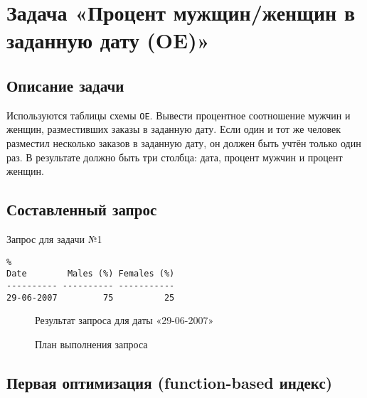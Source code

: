 \chapter{Задача «Процент мужщин/женщин в заданную дату (OE)»}


\section{Описание задачи}


Используются таблицы схемы \texttt{OE}. Вывести процентное соотношение мужчин и женщин, разместивших заказы в заданную дату. Если один и тот же человек разместил несколько заказов в заданную дату, он должен быть учтён только один раз. В результате должно быть три столбца: дата, процент мужчин и процент женщин.


\section{Составленный запрос}


\begin{algorithm}[H]
  \caption{Запрос для задачи №1}
  \label{code-task-1}
\end{algorithm}

\begin{samepage}%
  \begin{verbatim}%
Date        Males (%) Females (%)
---------- ---------- -----------
29-06-2007         75          25
  \end{verbatim}
  \begin{figure}[H]%
    \caption{Результат запроса для даты «29-06-2007»}
    \label{fig-task-1-output}
  \end{figure}
\end{samepage}


\begin{figure}[H]%
  \caption{План выполнения запроса}
  \label{fig-task-1-plan}
\end{figure}


\section{Первая оптимизация (function-based индекс)}


